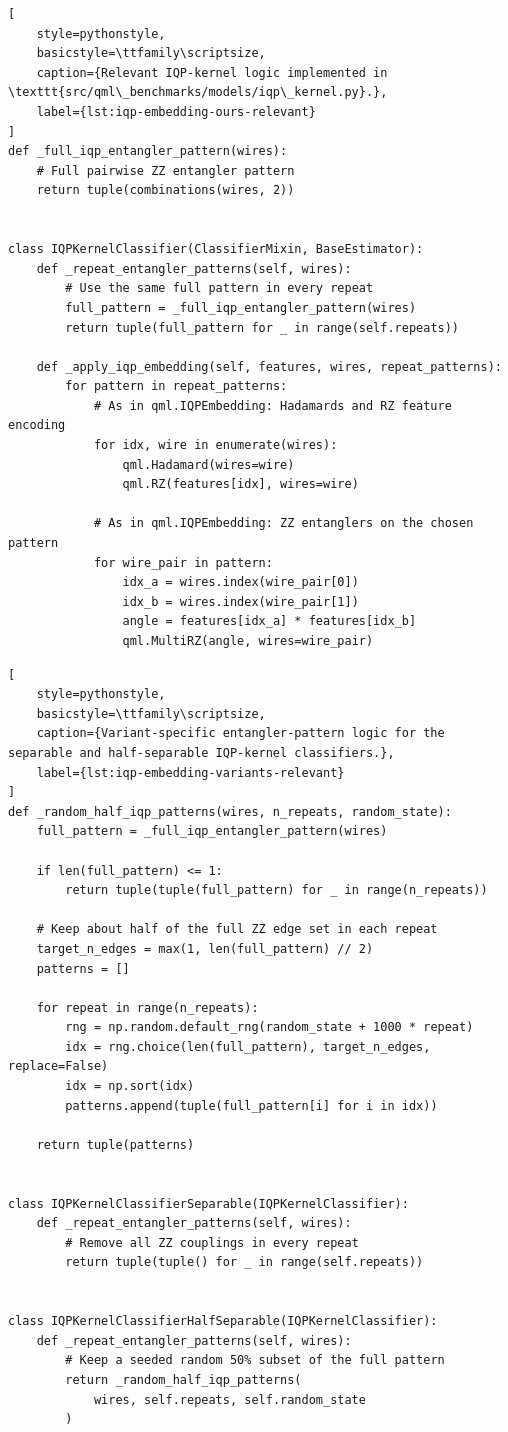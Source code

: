 \documentclass[12pt,a4paper,openany]{report}
\begin{document}
\begin{lstlisting}[
    style=pythonstyle,
    basicstyle=\ttfamily\scriptsize,
    caption={Relevant IQP-kernel logic implemented in \texttt{src/qml\_benchmarks/models/iqp\_kernel.py}.},
    label={lst:iqp-embedding-ours-relevant}
]
def _full_iqp_entangler_pattern(wires):
    # Full pairwise ZZ entangler pattern
    return tuple(combinations(wires, 2))


class IQPKernelClassifier(ClassifierMixin, BaseEstimator):
    def _repeat_entangler_patterns(self, wires):
        # Use the same full pattern in every repeat
        full_pattern = _full_iqp_entangler_pattern(wires)
        return tuple(full_pattern for _ in range(self.repeats))

    def _apply_iqp_embedding(self, features, wires, repeat_patterns):
        for pattern in repeat_patterns:
            # As in qml.IQPEmbedding: Hadamards and RZ feature encoding
            for idx, wire in enumerate(wires):
                qml.Hadamard(wires=wire)
                qml.RZ(features[idx], wires=wire)

            # As in qml.IQPEmbedding: ZZ entanglers on the chosen pattern
            for wire_pair in pattern:
                idx_a = wires.index(wire_pair[0])
                idx_b = wires.index(wire_pair[1])
                angle = features[idx_a] * features[idx_b]
                qml.MultiRZ(angle, wires=wire_pair)
\end{lstlisting}
\begin{lstlisting}[
    style=pythonstyle,
    basicstyle=\ttfamily\scriptsize,
    caption={Variant-specific entangler-pattern logic for the separable and half-separable IQP-kernel classifiers.},
    label={lst:iqp-embedding-variants-relevant}
]
def _random_half_iqp_patterns(wires, n_repeats, random_state):
    full_pattern = _full_iqp_entangler_pattern(wires)

    if len(full_pattern) <= 1:
        return tuple(tuple(full_pattern) for _ in range(n_repeats))

    # Keep about half of the full ZZ edge set in each repeat
    target_n_edges = max(1, len(full_pattern) // 2)
    patterns = []

    for repeat in range(n_repeats):
        rng = np.random.default_rng(random_state + 1000 * repeat)
        idx = rng.choice(len(full_pattern), target_n_edges, replace=False)
        idx = np.sort(idx)
        patterns.append(tuple(full_pattern[i] for i in idx))

    return tuple(patterns)


class IQPKernelClassifierSeparable(IQPKernelClassifier):
    def _repeat_entangler_patterns(self, wires):
        # Remove all ZZ couplings in every repeat
        return tuple(tuple() for _ in range(self.repeats))


class IQPKernelClassifierHalfSeparable(IQPKernelClassifier):
    def _repeat_entangler_patterns(self, wires):
        # Keep a seeded random 50% subset of the full pattern
        return _random_half_iqp_patterns(
            wires, self.repeats, self.random_state
        )
\end{lstlisting}
\end{document}
